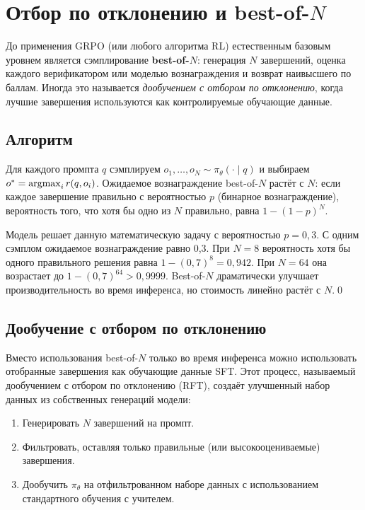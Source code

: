 \section{Отбор по отклонению и best-of-$N$}
\label{sec:rejection-sampling}


До применения GRPO (или любого алгоритма RL) естественным базовым уровнем является сэмплирование \textbf{best-of-$N$}: генерация $N$ завершений, оценка каждого верификатором или моделью вознаграждения и возврат наивысшего по баллам. Иногда это называется \emph{дообучением с отбором по отклонению}, когда лучшие завершения используются как контролируемые обучающие данные.

\subsection{Алгоритм}

Для каждого промпта $q$ сэмплируем $o_1, \ldots, o_N \sim \pi_\theta(\cdot \mid q)$ и выбираем $o^* = \operatorname*{argmax}_{i} r(q, o_i)$. Ожидаемое вознаграждение best-of-$N$ растёт с $N$: если каждое завершение правильно с вероятностью $p$ (бинарное вознаграждение), вероятность того, что хотя бы одно из $N$ правильно, равна $1 - (1-p)^N$.

\begin{example}
\label{ex:best-of-n}
Модель решает данную математическую задачу с вероятностью $p = 0{,}3$. С одним сэмплом ожидаемое вознаграждение равно 0,3. При $N = 8$ вероятность хотя бы одного правильного решения равна $1 - (0{,}7)^8 = 0{,}942$. При $N = 64$ она возрастает до $1 - (0{,}7)^{64} > 0{,}9999$. Best-of-$N$ драматически улучшает производительность во время инференса, но стоимость линейно растёт с $N$.\qed
\end{example}

\subsection{Дообучение с отбором по отклонению}

Вместо использования best-of-$N$ только во время инференса можно использовать отобранные завершения как обучающие данные SFT. Этот процесс, называемый дообучением с отбором по отклонению (RFT), создаёт улучшенный набор данных из собственных генераций модели:
\begin{enumerate}[leftmargin=*]
  \item Генерировать $N$ завершений на промпт.
  \item Фильтровать, оставляя только правильные (или высокооцениваемые) завершения.
  \item Дообучить $\pi_\theta$ на отфильтрованном наборе данных с использованием стандартного обучения с учителем.
\end{enumerate}


